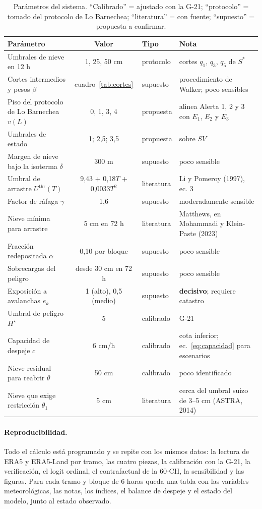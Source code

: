 \begin{table}[H]
\centering\small
\caption{Parámetros del sistema. ``Calibrado'' = ajustado con la G-21; ``protocolo'' = tomado del protocolo de Lo Barnechea; ``literatura'' = con fuente; ``supuesto'' = propuesta a confirmar.}
\label{tab:parametros}
\begin{tabularx}{\textwidth}{|l|c|l|>{\raggedright\arraybackslash}X|}
\hline
Parámetro & Valor & Tipo & Nota \\ \hline
Umbrales de nieve en 12 h & 1, 25, 50 cm & protocolo & cortes $q_1$, $q_3$, $q_5$ de $S^*$ \\ \hline
Cortes intermedios y pesos $\beta$ & cuadro~\ref{tab:cortes} & supuesto & procedimiento de Walker; poco sensibles \\ \hline
Piso del protocolo de Lo Barnechea $v(L)$ & 0, 1, 3, 4 & propuesta & alinea Alerta 1, 2 y 3 con $E_1$, $E_2$ y $E_3$ \\ \hline
Umbrales de estado & 1; 2,5; 3,5 & propuesta & sobre $SV$ \\ \hline
Margen de nieve bajo la isoterma $\delta$ & 300 m & supuesto & poco sensible \\ \hline
Umbral de arrastre $U^{\mathrm{thr}}(T)$ & 9,43 + 0,18$T$ + 0,0033$T^2$ & literatura & Li y Pomeroy (1997), ec. 3 \\ \hline
Factor de ráfaga $\gamma$ & 1,6 & supuesto & moderadamente sensible \\ \hline
Nieve mínima para arrastre & 5 cm en 72 h & literatura & Matthews, en Mohammadi y Klein-Paste (2023) \\ \hline
Fracción redepositada $\alpha$ & 0,10 por bloque & supuesto & poco sensible \\ \hline
Sobrecargas del peligro & desde 30 cm en 72 h & supuesto & poco sensible \\ \hline
Exposición a avalanchas $e_k$ & 1 (alto), 0,5 (medio) & supuesto & \textbf{decisivo}; requiere catastro \\ \hline
Umbral de peligro $H^\star$ & 5 & calibrado & G-21 \\ \hline
Capacidad de despeje $c$ & 6 cm/h & calibrado & cota inferior; ec.~\eqref{eq:capacidad} para escenarios \\ \hline
Nieve residual para reabrir $\theta$ & 50 cm & calibrado & poco identificado \\ \hline
Nieve que exige restricción $\theta_1$ & 5 cm & literatura & cerca del umbral suizo de 3--5 cm (ASTRA, 2014) \\ \hline
\end{tabularx}
\end{table}

\paragraph{Reproducibilidad.} Todo el cálculo está programado y se repite con los mismos datos: la lectura de ERA5 y ERA5-Land por tramo, las cuatro piezas, la calibración con la G-21, la verificación, el logit ordinal, el contrafactual de la 60-CH, la sensibilidad y las figuras. Para cada tramo y bloque de 6 horas queda una tabla con las variables meteorológicas, las notas, los índices, el balance de despeje y el estado del modelo, junto al estado observado.
